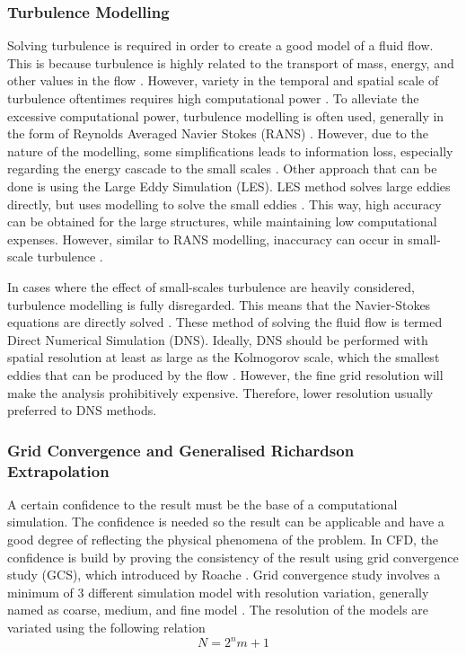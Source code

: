 \subsubsection{Turbulence Modelling}
\label{sec:litrev_turbmethod}
Solving turbulence is required in order to create a good model of a fluid flow. This is because turbulence is highly related to the transport of mass, energy, and other values in the flow \cite{Trench2023}. However, variety in the temporal and spatial scale of turbulence oftentimes requires high computational power \cite{Duraisamy2019}. To alleviate the excessive computational power, turbulence modelling is often used, generally in the form of Reynolds Averaged Navier Stokes (RANS) \cite{Sidik2020}. However, due to the nature of the modelling, some simplifications leads to information loss, especially regarding the energy cascade to the small scales \cite{bush2020}. Other approach that can be done is using the Large Eddy Simulation (LES). LES method solves large eddies directly, but uses modelling to solve the small eddies \cite{Zhiyin2015}. This way, high accuracy can be obtained for the large structures, while maintaining low computational expenses. However, similar to RANS modelling, inaccuracy can occur in small-scale turbulence \cite{Mason1994}.

In cases where the effect of small-scales turbulence are heavily considered, turbulence modelling is fully disregarded. This means that the Navier-Stokes equations are directly solved \cite{Moin1998}. These method of solving the fluid flow is termed Direct Numerical Simulation (DNS). Ideally, DNS should be performed with spatial resolution at least as large as the Kolmogorov scale, which the smallest eddies that can be produced by the flow \cite{Boschung2016}. However, the fine grid resolution will make the analysis prohibitively expensive. Therefore, lower resolution usually preferred to DNS methods. %

\subsubsection{Grid Convergence and Generalised Richardson Extrapolation}
A certain confidence to the result must be the base of a computational simulation. The confidence is needed so the result can be applicable and have a good degree of reflecting the physical phenomena of the problem. In CFD, the confidence is build by proving the consistency of the result using grid convergence study (GCS), which introduced by Roache \cite{roache2009verification}. Grid convergence study involves a minimum of 3 different simulation model with resolution variation, generally named as coarse, medium, and fine model \cite{Groves2012}. The resolution of the models are variated using the following relation
\begin{equation}
	N = 2^n m + 1
\end{equation}

